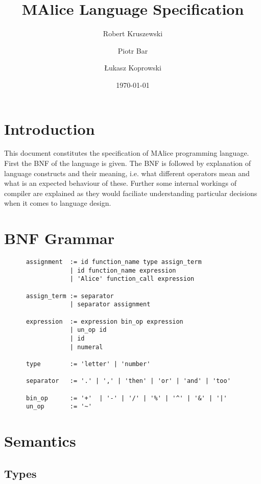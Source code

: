 \documentclass[a4wide, 11pt]{article}
\begin{document}
\title{MAlice Language Specification}

\author{Robert Kruszewski \and Piotr Bar \and Łukasz Koprowski}


\date{\today}         %

\maketitle            %

\section{Introduction}

This document constitutes the specification of MAlice programming language.
First the BNF of the language is given. The BNF is followed by explanation
of language constructs and their meaning, i.e. what different operators mean
and what is an expected behaviour of these. Further some internal workings of compiler
are explained as they would faciliate understanding particular decisions when
it comes to language design.

\section{BNF Grammar} 

\begin{verbatim}
      assignment  := id function_name type assign_term
                  | id function_name expression 
                  | 'Alice' function_call expression

      assign_term := separator
                  | separator assignment

      expression  := expression bin_op expression 
                  | un_op id
                  | id
                  | numeral

      type        := 'letter' | 'number'

      separator   := '.' | ',' | 'then' | 'or' | 'and' | 'too'

      bin_op      := '+'  | '-' | '/' | '%' | '^' | '&' | '|'
      un_op       := '~'
\end{verbatim}

\section{Semantics}

\subsection{Types}
\end{document}
